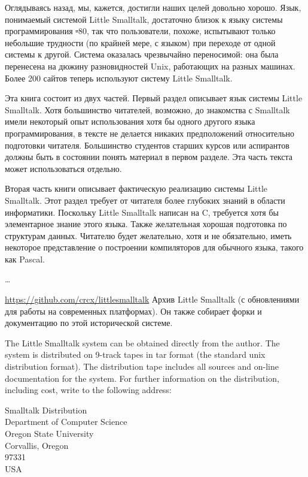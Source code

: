 \noindent
Оглядываясь назад, мы, кажется, достигли наших целей довольно хорошо. Язык, понимаемый 
системой Little Smalltalk, достаточно близок к языку системы программирования 
\st-80, так что пользователи, похоже, испытывают только небольшие трудности 
(по крайней мере, с языком) при переходе от одной системы к другой. Система 
оказалась чрезвычайно переносимой: она была перенесена на дюжину разновидностей 
Unix, работающих на разных машинах. Более 200 сайтов теперь используют 
систему Little Smalltalk.


Эта книга состоит из двух частей. Первый раздел описывает язык системы Little 
Smalltalk. Хотя большинство читателей, возможно, до знакомства с Smalltalk 
имели некоторый опыт использования хотя бы одного другого языка программирования, 
в тексте не делается никаких предположений относительно подготовки читателя. 
Большинство студентов старших курсов или аспирантов должны быть в состоянии 
понять материал в первом разделе. Эта часть текста может использоваться отдельно.

Вторая часть книги описывает фактическую реализацию системы Little Smalltalk. 
Этот раздел требует от читателя более глубоких знаний в области информатики. 
Поскольку Little Smalltalk написан на C, требуется хотя бы элементарное знание 
этого языка. Также желательная хорошая подготовка по структурам данных. 
Читателю будет желательно, хотя и не обязательно, иметь некоторое 
представление о построении компиляторов для обычного языка, такого как Pascal.


\ldots


\url{https://github.com/crcx/littlesmalltalk} Архив Little Smalltalk 
(с обновлениями для работы на современных платформах). 
Он также собирает форки и документацию по этой исторической системе.

\bigskip

The Little Smalltalk system can be obtained directly from the author. The
system is distributed on 9-track tapes in tar format (the standard unix
distribution format). The distribution tape includes all sources and on-line
documentation for the system. For further information on the distribution,
including cost, write to the following address:

\bigskip\noindent
Smalltalk Distribution\\
Department of Computer Science\\
Oregon State University\\
Corvallis, Oregon\\
97331\\
USA
